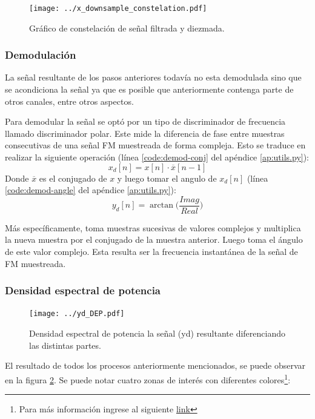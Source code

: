 \begin{figure}[ht!]
	\centering
	\texttt{[image: ../x\_downsample\_constelation.pdf]}
	\caption{Gráfico de constelación de señal filtrada y diezmada.}
	\label{fig:x_downsample_constelation}
\end{figure}

\subsubsection{Demodulación}
La señal resultante de los pasos anteriores todavía no esta demodulada sino que se acondiciona la señal ya que es posible que anteriormente contenga parte de otros canales, entre otros aspectos. 

Para demodular la señal se optó por un tipo de discriminador de frecuencia llamado discriminador polar.
Este mide la diferencia de fase entre muestras consecutivas de una señal FM muestreada de forma compleja. Esto se traduce en realizar la siguiente operación (línea \ref{code:demod-conj} del apéndice \ref{ap:utils.py}):
$$
	x_d[n] = x[n] \cdot \overline{x}[n-1]
$$
Donde $\overline{x}$ es el conjugado de $x$ y luego tomar el angulo de $x_d[n]$ (línea \ref{code:demod-angle} del apéndice \ref{ap:utils.py}):
$$
	y_d[n] = \arctan\Big( \frac{Imag}{Real} \Big)
$$

Más específicamente, toma muestras sucesivas de valores complejos y multiplica la nueva muestra por el conjugado de la muestra anterior. Luego toma el ángulo de este valor complejo. Esta resulta ser la frecuencia instantánea de la señal de FM muestreada.

\subsubsection{Densidad espectral de potencia}

\begin{figure}[ht!]
	\centering
	\texttt{[image: ../yd\_DEP.pdf]}
	\caption{Densidad espectral de potencia la señal (yd) resultante diferenciando las distintas partes.}
	\label{fig:yd-DEP}
\end{figure}

El resultado de todos los procesos anteriormente mencionados, se puede observar en la figura \ref{fig:yd-DEP}.
Se puede notar cuatro zonas de interés con diferentes colores\footnote{Para más información ingrese al siguiente \href{https://en.wikipedia.org/wiki/FM\_broadcasting\#Other\_subcarrier\_services}{link}}:


